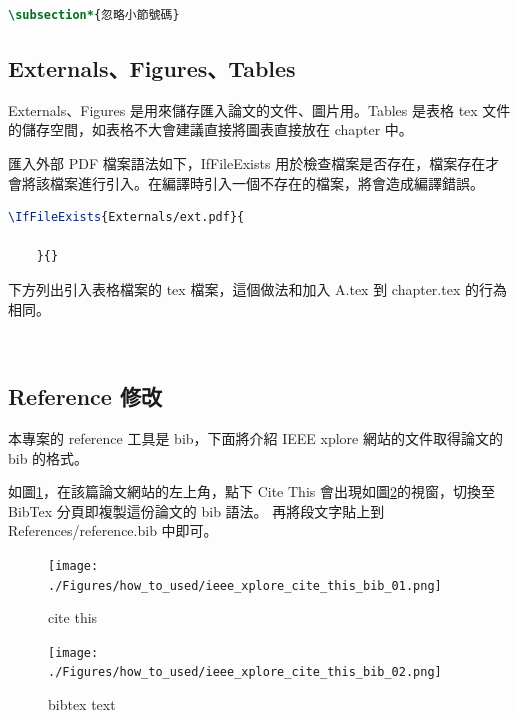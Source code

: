 \begin{lstlisting}[language=TeX]
    \subsection*{忽略小節號碼}
\end{lstlisting}

\subsection*{Externals、Figures、Tables}

Externals、Figures 是用來儲存匯入論文的文件、圖片用。Tables 是表格 tex 文件的儲存空間，如表格不大會建議直接將圖表直接放在 chapter 中。

匯入外部 PDF 檔案語法如下，IfFileExists 用於檢查檔案是否存在，檔案存在才會將該檔案進行引入。在編譯時引入一個不存在的檔案，將會造成編譯錯誤。
\begin{lstlisting}[language=TeX]
    \IfFileExists{Externals/ext.pdf}{
        
    }{}
\end{lstlisting}

下方列出引入表格檔案的 tex 檔案，這個做法和加入 A.tex 到 chapter.tex 的行為相同。
\begin{lstlisting}[language=TeX]
    
\end{lstlisting}

\subsection*{Reference 修改}

本專案的 reference 工具是 bib，下面將介紹 IEEE xplore 網站的文件取得論文的 bib 的格式。

如圖\ref{fig_bib_1}，在該篇論文網站的左上角，點下 Cite This 會出現如圖\ref{fig_bib_2}的視窗，切換至 BibTex 分頁即複製這份論文的 bib 語法。
再將段文字貼上到 References/reference.bib 中即可。

\begin{figure}[H] 
    \centering 
    \texttt{[image: ./Figures/how\_to\_used/ieee\_xplore\_cite\_this\_bib\_01.png]} 
    \caption{cite this}
    \label{fig_bib_1}
\end{figure}

\begin{figure}[H] 
    \centering 
    \texttt{[image: ./Figures/how\_to\_used/ieee\_xplore\_cite\_this\_bib\_02.png]} 
    \caption{bibtex text}
    \label{fig_bib_2}
\end{figure}

